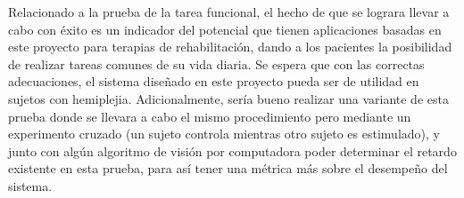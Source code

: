 Relacionado a la prueba de la tarea funcional, el hecho de que se lograra llevar a cabo con éxito es un indicador del potencial que tienen aplicaciones basadas en este proyecto para terapias de rehabilitación, dando a los pacientes la posibilidad de realizar tareas comunes de su vida diaria. Se espera que con las correctas adecuaciones, el sistema diseñado en este proyecto pueda ser de utilidad en sujetos con hemiplejia. Adicionalmente, sería bueno realizar una variante de esta prueba donde se llevara a cabo el mismo procedimiento pero mediante un experimento cruzado (un sujeto controla mientras otro sujeto es estimulado), y junto con algún algoritmo de visión por computadora poder determinar el retardo existente en esta prueba, para así tener una métrica más sobre el desempeño del sistema.


